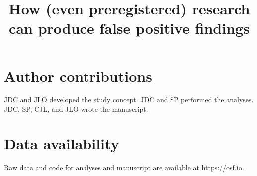 \documentclass[english,natbib,man,floatsintext]{apa6}
\title{How (even preregistered) research can produce false positive findings}
\begin{document}
\maketitle









\section{Author contributions}
JDC and JLO developed the study concept. JDC and SP performed the analyses. JDC, SP, CJL, and JLO wrote the manuscript. 

\section{Data availability}
Raw data and code for analyses and manuscript are available at \url{https://osf.io}.



\clearpage

 
\end{document}
